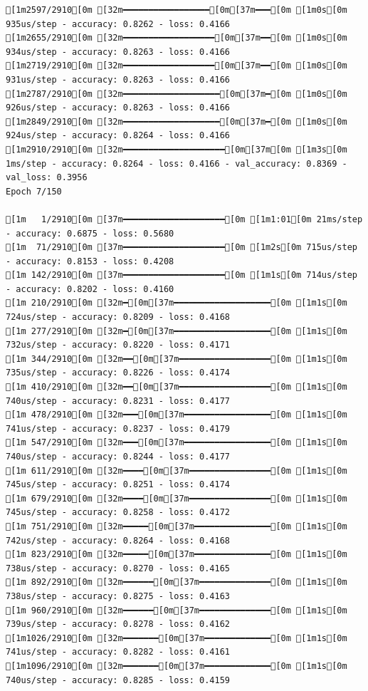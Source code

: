 \documentclass[
  letterpaper,
  DIV=11,
  numbers=noendperiod]{scrartcl}
\begin{document}
\begin{verbatim}
[1m2597/2910[0m [32m━━━━━━━━━━━━━━━━━[0m[37m━━━[0m [1m0s[0m 935us/step - accuracy: 0.8262 - loss: 0.4166
[1m2655/2910[0m [32m━━━━━━━━━━━━━━━━━━[0m[37m━━[0m [1m0s[0m 934us/step - accuracy: 0.8263 - loss: 0.4166
[1m2719/2910[0m [32m━━━━━━━━━━━━━━━━━━[0m[37m━━[0m [1m0s[0m 931us/step - accuracy: 0.8263 - loss: 0.4166
[1m2787/2910[0m [32m━━━━━━━━━━━━━━━━━━━[0m[37m━[0m [1m0s[0m 926us/step - accuracy: 0.8263 - loss: 0.4166
[1m2849/2910[0m [32m━━━━━━━━━━━━━━━━━━━[0m[37m━[0m [1m0s[0m 924us/step - accuracy: 0.8264 - loss: 0.4166
[1m2910/2910[0m [32m━━━━━━━━━━━━━━━━━━━━[0m[37m[0m [1m3s[0m 1ms/step - accuracy: 0.8264 - loss: 0.4166 - val_accuracy: 0.8369 - val_loss: 0.3956
Epoch 7/150

[1m   1/2910[0m [37m━━━━━━━━━━━━━━━━━━━━[0m [1m1:01[0m 21ms/step - accuracy: 0.6875 - loss: 0.5680
[1m  71/2910[0m [37m━━━━━━━━━━━━━━━━━━━━[0m [1m2s[0m 715us/step - accuracy: 0.8153 - loss: 0.4208 
[1m 142/2910[0m [37m━━━━━━━━━━━━━━━━━━━━[0m [1m1s[0m 714us/step - accuracy: 0.8202 - loss: 0.4160
[1m 210/2910[0m [32m━[0m[37m━━━━━━━━━━━━━━━━━━━[0m [1m1s[0m 724us/step - accuracy: 0.8209 - loss: 0.4168
[1m 277/2910[0m [32m━[0m[37m━━━━━━━━━━━━━━━━━━━[0m [1m1s[0m 732us/step - accuracy: 0.8220 - loss: 0.4171
[1m 344/2910[0m [32m━━[0m[37m━━━━━━━━━━━━━━━━━━[0m [1m1s[0m 735us/step - accuracy: 0.8226 - loss: 0.4174
[1m 410/2910[0m [32m━━[0m[37m━━━━━━━━━━━━━━━━━━[0m [1m1s[0m 740us/step - accuracy: 0.8231 - loss: 0.4177
[1m 478/2910[0m [32m━━━[0m[37m━━━━━━━━━━━━━━━━━[0m [1m1s[0m 741us/step - accuracy: 0.8237 - loss: 0.4179
[1m 547/2910[0m [32m━━━[0m[37m━━━━━━━━━━━━━━━━━[0m [1m1s[0m 740us/step - accuracy: 0.8244 - loss: 0.4177
[1m 611/2910[0m [32m━━━━[0m[37m━━━━━━━━━━━━━━━━[0m [1m1s[0m 745us/step - accuracy: 0.8251 - loss: 0.4174
[1m 679/2910[0m [32m━━━━[0m[37m━━━━━━━━━━━━━━━━[0m [1m1s[0m 745us/step - accuracy: 0.8258 - loss: 0.4172
[1m 751/2910[0m [32m━━━━━[0m[37m━━━━━━━━━━━━━━━[0m [1m1s[0m 742us/step - accuracy: 0.8264 - loss: 0.4168
[1m 823/2910[0m [32m━━━━━[0m[37m━━━━━━━━━━━━━━━[0m [1m1s[0m 738us/step - accuracy: 0.8270 - loss: 0.4165
[1m 892/2910[0m [32m━━━━━━[0m[37m━━━━━━━━━━━━━━[0m [1m1s[0m 738us/step - accuracy: 0.8275 - loss: 0.4163
[1m 960/2910[0m [32m━━━━━━[0m[37m━━━━━━━━━━━━━━[0m [1m1s[0m 739us/step - accuracy: 0.8278 - loss: 0.4162
[1m1026/2910[0m [32m━━━━━━━[0m[37m━━━━━━━━━━━━━[0m [1m1s[0m 741us/step - accuracy: 0.8282 - loss: 0.4161
[1m1096/2910[0m [32m━━━━━━━[0m[37m━━━━━━━━━━━━━[0m [1m1s[0m 740us/step - accuracy: 0.8285 - loss: 0.4159

\end{verbatim}
\end{document}
